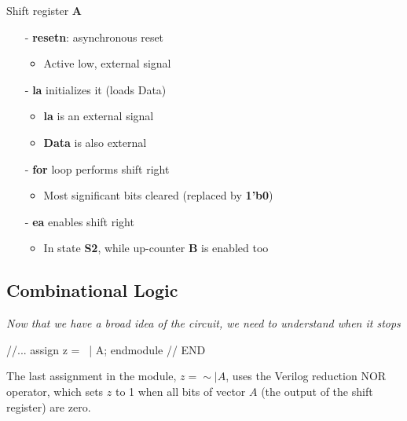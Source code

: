 \documentclass[12pt,openany]{book}
\begin{document}
\begin{minipage}[htp]{0.45\textwidth}
\begin{justify}
	 Shift register \textbf{A}
	\begin{itemize}
		\item[-] \textbf{resetn}: asynchronous reset
		\begin{itemize}
			\item Active low, external signal
		\end{itemize}
		\item[-] \textbf{la} initializes it (loads Data)
		\begin{itemize}
			\item \textbf{la} is an external signal
			\item \textbf{Data} is also external
		\end{itemize}
		\item[-] \textbf{for} loop performs shift right
		\begin{itemize}
			\item Most significant bits cleared (replaced by \textbf{1'b0})
		\end{itemize}
		\item[-] \textbf{ea} enables shift right
		\begin{itemize}
			\item In state \textbf{S2}, while up-counter \textbf{B} is enabled too
		\end{itemize}
	\end{itemize}
\end{justify}
\end{minipage}
\subsection{Combinational Logic}
\textit{Now that we have a broad idea of the circuit, we need to understand when it stops}\newline

\begin{minipage}[htp]{0.45\textwidth}
\begin{vhdl}
//...
assign z = ~| A;
endmodule
// END
\end{vhdl}
\end{minipage}
\hfill
\vline
\hfill
\begin{minipage}[htp]{0.45\textwidth}
	The last assignment in the module, \( z = \sim| A \), uses the Verilog reduction NOR operator, which sets \( z \) to 1 when all bits of vector \( A \) (the output of the shift register) are zero.
\end{minipage}
\end{document}
